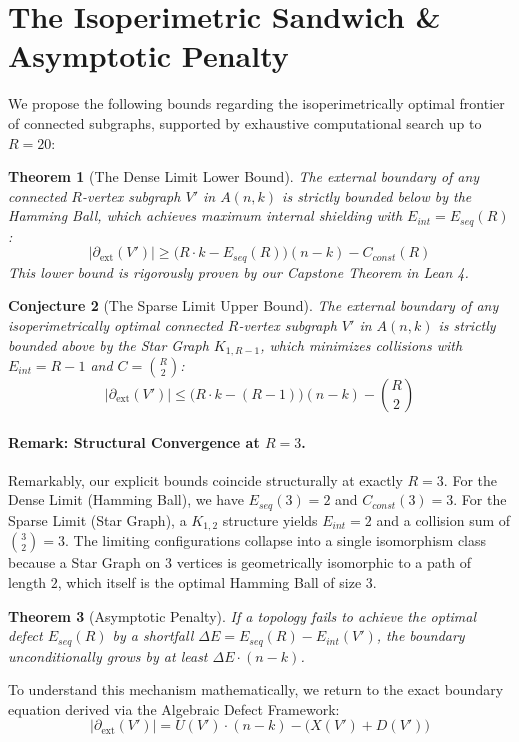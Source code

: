 \documentclass[11pt, letterpaper]{article}
\newtheorem{theorem}{Theorem}[section]
\newtheorem{conjecture}[theorem]{Conjecture}
\theoremstyle{definition}
\theoremstyle{remark}
\begin{document}
\section{The Isoperimetric Sandwich \& Asymptotic Penalty}

We propose the following bounds regarding the isoperimetrically optimal frontier of connected subgraphs, supported by exhaustive computational search up to $R=20$:

\begin{theorem}[The Dense Limit Lower Bound]
The external boundary of any connected $R$-vertex subgraph $V'$ in $A(n,k)$ is strictly bounded below by the Hamming Ball, which achieves maximum internal shielding with $E_{int} = E_{seq}(R)$:
\begin{equation*}
\left| \partial_{\mathrm{ext}}(V') \right| \ge \big(R \cdot k - E_{seq}(R)\big)(n-k) - C_{const}(R)
\end{equation*} This lower bound is rigorously proven by our Capstone Theorem in Lean 4.
\end{theorem}

\begin{conjecture}[The Sparse Limit Upper Bound]
The external boundary of any isoperimetrically optimal connected $R$-vertex subgraph $V'$ in $A(n,k)$ is strictly bounded above by the Star Graph $K_{1, R-1}$, which minimizes collisions with $E_{int} = R-1$ and $C = \binom{R}{2}$:
\begin{equation*}
\left| \partial_{\mathrm{ext}}(V') \right| \le \big(R \cdot k - (R - 1)\big)(n - k) - \binom{R}{2}
\end{equation*}
\end{conjecture}

\paragraph{Remark: Structural Convergence at $R=3$.}
Remarkably, our explicit bounds coincide structurally at exactly $R=3$. For the Dense Limit (Hamming Ball), we have $E_{seq}(3) = 2$ and $C_{const}(3) = 3$. For the Sparse Limit (Star Graph), a $K_{1,2}$ structure yields $E_{int} = 2$ and a collision sum of $\binom{3}{2} = 3$. The limiting configurations collapse into a single isomorphism class because a Star Graph on $3$ vertices is geometrically isomorphic to a path of length $2$, which itself is the optimal Hamming Ball of size 3.

\begin{theorem}[Asymptotic Penalty]\label{them:penalty}
If a topology fails to achieve the optimal defect $E_{seq}(R)$ by a shortfall $\Delta E = E_{seq}(R) - E_{int}(V')$, the boundary unconditionally grows by at least $\Delta E \cdot (n-k)$.
\end{theorem}
To understand this mechanism mathematically, we return to the exact boundary equation derived via the Algebraic Defect Framework:
\begin{equation*}
\left| \partial_{\mathrm{ext}}(V') \right| = U(V') \cdot (n - k) - \big(X(V') + D(V')\big)
\end{equation*}
\end{document}
